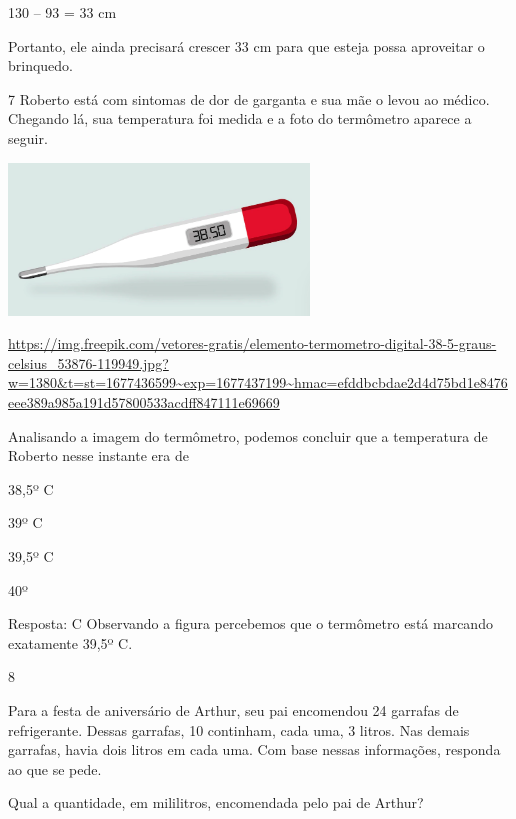\begin{escolha}
130 -- 93 = 33 cm

Portanto, ele ainda precisará crescer 33 cm para que esteja possa aproveitar o brinquedo.

\num{7} Roberto está com sintomas de dor de garganta e sua mãe o levou ao
médico. Chegando lá, sua temperatura foi medida e a foto do termômetro
aparece a seguir.

\includegraphics[width=3.15000in,height=1.59426in]{media/image47.png}

\url{https://img.freepik.com/vetores-gratis/elemento-termometro-digital-38-5-graus-celsius_53876-119949.jpg?w=1380\&t=st=1677436599~exp=1677437199~hmac=efddbcbdae2d4d75bd1e8476eee389a985a191d57800533acdff847111e69669}


Analisando a imagem do termômetro, podemos concluir que a temperatura de Roberto nesse instante era de

\begin{escolha}

\item
  38,5º C
\item
  39º C
\item
  39,5º C
\item
  40º
\end{escolha}

Resposta: C
Observando a figura percebemos que o termômetro está marcando exatamente
39,5º C.

\num{8}

Para a festa de aniversário de Arthur, seu pai encomendou 24 garrafas de
refrigerante. Dessas garrafas, 10 continham, cada uma, 3 litros. Nas
demais garrafas, havia dois litros em cada uma. Com base nessas
informações, responda ao que se pede.

\begin{escolha}

\item
  Qual a quantidade, em mililitros, encomendada pelo pai de Arthur?


\end{escolha}
\end{escolha}
